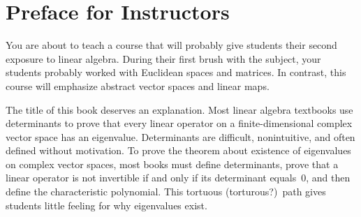 \section{Preface for Instructors} \label{forInstructors}

You are about to teach a course that will probably give students their
second exposure to linear algebra.  During their first brush with the
subject, your students probably worked with Euclidean spaces and
matrices.  In contrast, this course will emphasize abstract vector
spaces and linear maps.

The title of this book deserves an explanation.  Most linear
algebra textbooks use determinants to prove that every linear operator on a
finite-dimensional complex vector space has an eigenvalue.
Determinants are difficult, nonintuitive, and often defined without
motivation.  To prove the theorem about existence of eigenvalues on
complex vector spaces, most books must define determinants, prove that
a linear operator is not invertible if and only if its determinant
equals~$0$, and then define the characteristic polynomial.  This
tortuous (torturous?)\ path gives students little feeling for why
eigenvalues exist.

